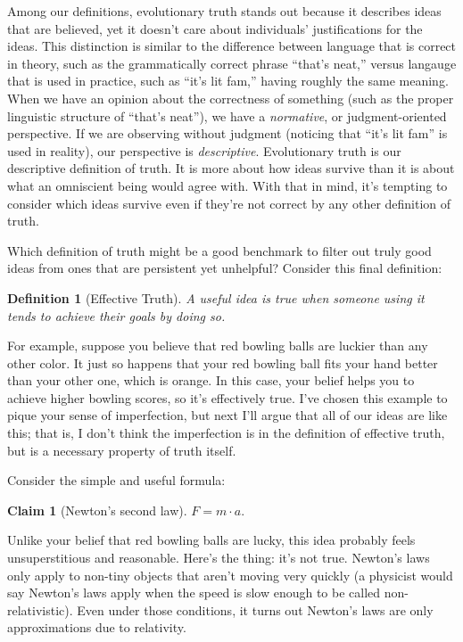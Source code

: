 \documentclass[11pt, oneside]{article}   	%
\newtheorem{defn}{Definition}
\newtheorem{claim}{Claim}
\begin{document}
Among our definitions, evolutionary truth stands out because it describes
ideas that are believed, yet it doesn't
care about individuals' justifications for the ideas.
This distinction is similar to the difference
between language that is correct in theory, such as the grammatically
correct phrase ``that's neat,'' versus
langauge that is used in practice, such as ``it's lit fam,'' having roughly the
same meaning.
When we have an opinion about the correctness of something (such as the
proper linguistic structure of ``that's
neat''), we have a {\em
normative}, or judgment-oriented perspective.
If we are observing
without judgment (noticing that ``it's lit fam'' is used in reality),
our perspective is {\em descriptive}.
Evolutionary truth is our descriptive definition of truth.
It is more about how ideas survive than it is about what an omniscient being
would agree with.
With that in mind, it's tempting to consider which ideas survive even
if they're not correct by any other definition of truth.

Which definition of truth might be a good benchmark to filter out truly
good ideas from ones that are persistent yet unhelpful?
Consider this final definition:
\begin{defn}[Effective Truth]\label{d8}
    A useful idea is true when someone using it tends to achieve their goals by
    doing so.
\end{defn}

For example, suppose you believe that red bowling balls are luckier than any
other color. It just so happens that your red bowling ball fits your hand better
than your other one, which is orange.
In this case, your belief helps you to
achieve higher bowling scores, so it's effectively true.
I've chosen this example to pique your sense of imperfection, but next I'll
argue that all of our ideas are like this; that is, I don't think the
imperfection is in the definition of effective truth,
but is a necessary property of truth itself.

Consider the simple and useful formula:
\begin{claim}[Newton's second law]
    $F = m \cdot a.$
\end{claim}

Unlike your belief that red bowling balls are lucky, this idea probably feels
unsuperstitious and reasonable. Here's the thing: it's not true.
Newton's laws only apply to non-tiny
objects that aren't moving very quickly (a physicist would say Newton's laws
apply when the speed is slow enough to be called non-relativistic).
Even under those conditions,
it turns out Newton's laws are only approximations due
to relativity.
\end{document}
